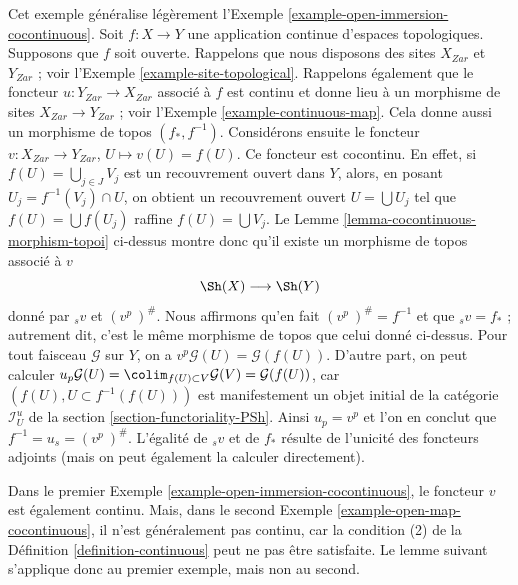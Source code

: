 \begin{example}
\label{example-open-map-cocontinuous}
Cet exemple généralise légèrement
l’Exemple \ref{example-open-immersion-cocontinuous}.
Soit $f : X \to Y$ une application continue d’espaces topologiques.
Supposons que $f$ soit ouverte.
Rappelons que nous disposons des sites $X_{Zar}$ et $Y_{Zar}$ ; voir
l’Exemple \ref{example-site-topological}.
Rappelons également que le foncteur $u : Y_{Zar} \to X_{Zar}$ associé à $f$
est continu et donne lieu à un morphisme de sites
$X_{Zar} \to Y_{Zar}$ ; voir l’Exemple \ref{example-continuous-map}.
Cela donne aussi un morphisme de topos $(f_*, f^{-1})$.
Considérons ensuite le foncteur
$v : X_{Zar} \to Y_{Zar}$, $U \mapsto v(U) = f(U)$.
Ce foncteur est cocontinu. En effet, si
$f(U) = \bigcup_{j \in J} V_j$ est un recouvrement ouvert dans $Y$, alors, en
posant $U_j = f^{-1}(V_j) \cap U$, on obtient un recouvrement ouvert
$U = \bigcup U_j$ tel que $f(U) = \bigcup f(U_j)$ raffine
$f(U) = \bigcup V_j$.
Le Lemme \ref{lemma-cocontinuous-morphism-topoi} ci-dessus montre donc qu’il
existe un morphisme de topos associé à $v$
$$
\Sh(X) \longrightarrow \Sh(Y)
$$
donné par ${}_sv$ et $(v^p\ )^\#$. Nous affirmons qu’en fait
$(v^p\ )^\# = f^{-1}$ et que ${}_sv = f_*$ ; autrement dit, c’est le même
morphisme de topos que celui donné ci-dessus. Pour tout faisceau
$\mathcal{G}$ sur $Y$, on a
$v^p\mathcal{G}(U) = \mathcal{G}(f(U))$.
D’autre part, on peut calculer
$u_p\mathcal{G}(U) = \colim_{f(U) \subset V} \mathcal{G}(V)
= \mathcal{G}(f(U))$, car $(f(U), U \subset f^{-1}(f(U)))$ est manifestement
un objet initial de la catégorie $\mathcal{I}_U^u$ de la
section \ref{section-functoriality-PSh}.
Ainsi $u_p = v^p$ et l’on en conclut que
$f^{-1} = u_s = (v^p\ )^\#$.
L’égalité de ${}_sv$ et de $f_*$ résulte de l’unicité des foncteurs adjoints
(mais on peut également la calculer directement).
\end{example}

\noindent
Dans le premier Exemple \ref{example-open-immersion-cocontinuous}, le
foncteur $v$ est également continu. Mais, dans le second
Exemple \ref{example-open-map-cocontinuous}, il n’est généralement pas
continu, car la condition (2) de la Définition \ref{definition-continuous}
peut ne pas être satisfaite. Le lemme suivant s’applique donc au premier
exemple, mais non au second.

